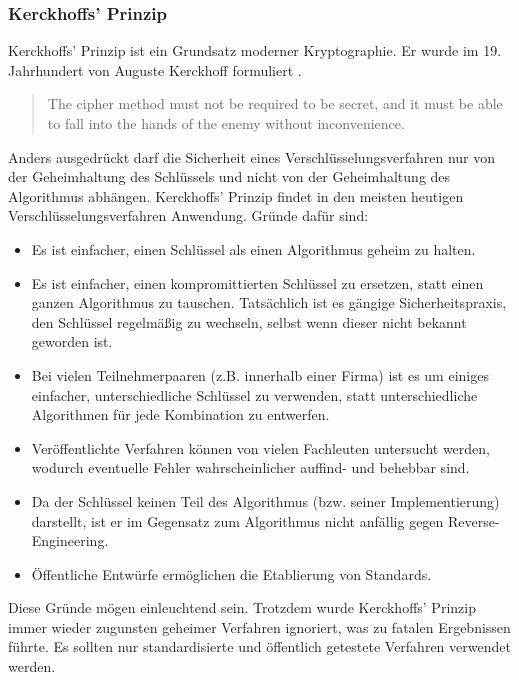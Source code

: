 \subsubsection{Kerckhoffs' Prinzip}

Kerckhoffs' Prinzip ist ein Grundsatz moderner Kryptographie. Er wurde im 19. Jahrhundert von Auguste Kerckhoff formuliert \cite{Kerckhoffs}.
\begin{quote}
The cipher method must not be required to be secret, and it must be able to fall into the hands of the enemy without inconvenience.
\end{quote}
Anders ausgedrückt darf die Sicherheit eines Verschlüsselungsverfahren nur von der Geheimhaltung des Schlüssels und nicht von der Geheimhaltung des Algorithmus abhängen.
Kerckhoffs' Prinzip findet in den meisten heutigen Verschlüsselungsverfahren Anwendung. Gründe dafür sind:
\begin{itemize}
\item Es ist einfacher, einen Schlüssel als einen Algorithmus geheim zu halten.
\item Es ist einfacher, einen kompromittierten Schlüssel zu ersetzen, statt einen ganzen Algorithmus zu tauschen. Tatsächlich ist es gängige Sicherheitspraxis, den Schlüssel regelmäßig zu wechseln, selbst wenn dieser nicht bekannt geworden ist.
\item Bei vielen Teilnehmerpaaren (z.B. innerhalb einer Firma) ist es um einiges einfacher, unterschiedliche Schlüssel zu verwenden, statt unterschiedliche Algorithmen für jede Kombination zu entwerfen.
\item Veröffentlichte Verfahren können von vielen Fachleuten untersucht werden, wodurch eventuelle Fehler wahrscheinlicher auffind- und behebbar sind.
\item Da der Schlüssel keinen Teil des Algorithmus (bzw. seiner Implementierung) darstellt, ist er im Gegensatz zum Algorithmus nicht anfällig gegen Reverse-Engineering.
\item Öffentliche Entwürfe ermöglichen die Etablierung von Standards.
\end{itemize}
Diese Gründe mögen einleuchtend sein. Trotzdem wurde Kerckhoffs' Prinzip immer wieder zugunsten geheimer Verfahren ignoriert, was zu fatalen Ergebnissen führte. Es sollten nur standardisierte und öffentlich getestete Verfahren verwendet werden.